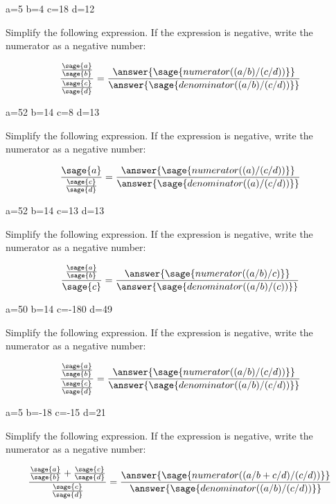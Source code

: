 \documentclass{ximera}
\begin{document}
\begin{problem}
\begin{sagesilent}
a=5
b=4
c=18
d=12
\end{sagesilent}
Simplify the following expression. If the expression is negative, write the numerator as a negative number:
\begin{prompt}
$$\frac{\frac{\sage{a}}{\sage{b}}}{\frac{\sage{c}}{\sage{d}}}=\frac{\answer{\sage{numerator((a/b)/(c/d))}}}{\answer{\sage{denominator((a/b)/(c/d))}}}$$
\end{prompt}
\end{problem}

\begin{problem}
\begin{sagesilent}
a=52
b=14
c=8
d=13
\end{sagesilent}
Simplify the following expression. If the expression is negative, write the numerator as a negative number:
\begin{prompt}
$$\frac{{\sage{a}}}{\frac{\sage{c}}{\sage{d}}}=\frac{\answer{\sage{numerator((a)/(c/d))}}}{\answer{\sage{denominator((a)/(c/d))}}}$$
\end{prompt}
\end{problem}


\begin{problem}
\begin{sagesilent}
a=52
b=14
c=13
d=13
\end{sagesilent}
Simplify the following expression. If the expression is negative, write the numerator as a negative number:
\begin{prompt}
$$\frac{\frac{\sage{a}}{\sage{b}}}{{\sage{c}}}=\frac{\answer{\sage{numerator((a/b)/c)}}}{\answer{\sage{denominator((a/b)/(c))}}}$$
\end{prompt}
\end{problem}


\begin{problem}
\begin{sagesilent}
a=50
b=14
c=-180
d=49
\end{sagesilent}
Simplify the following expression.  If the expression is negative, write the numerator as a negative number:
\begin{prompt}
$$\frac{\frac{\sage{a}}{\sage{b}}}{\frac{\sage{c}}{\sage{d}}}=\frac{\answer{\sage{numerator((a/b)/(c/d))}}}{\answer{\sage{denominator((a/b)/(c/d))}}}$$
\end{prompt}
\end{problem}


\begin{problem}
\begin{sagesilent}
a=5
b=-18
c=-15
d=21
\end{sagesilent}
Simplify the following expression.  If the expression is negative, write the numerator as a negative number:
\begin{prompt}
$$\frac{\frac{\sage{a}}{\sage{b}}+\frac{\sage{c}}{\sage{d}}}{\frac{\sage{c}}{\sage{d}}}=\frac{\answer{\sage{numerator((a/b+c/d)/(c/d))}}}{\answer{\sage{denominator((a/b)/(c/d))}}}$$
\end{prompt}
\end{problem}
\end{document}
